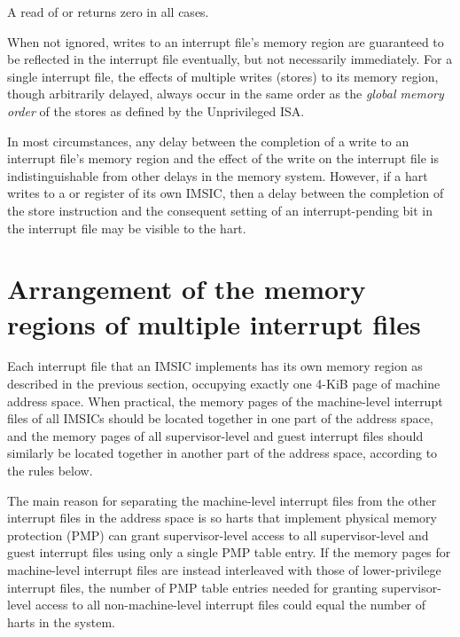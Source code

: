 A read of  or  returns zero in all
cases.

When not ignored, writes to an interrupt file's memory region are
guaranteed to be reflected in the interrupt file eventually, but not
necessarily immediately.
For a single interrupt file, the effects of multiple writes (stores) to
its memory region, though arbitrarily delayed, always occur in the same
order as the \textit{global memory order} of the stores as defined by
the {\RISCV} Unprivileged ISA.

\begin{commentary}
In most circumstances, any delay between the completion of a write to
an interrupt file's memory region and the effect of the write on the
interrupt file is indistinguishable from other delays in the memory
system.
However, if a hart writes to a  or 
register of its own IMSIC, then a delay between the completion of the
store instruction and the consequent setting of an interrupt-pending
bit in the interrupt file may be visible to the hart.
\end{commentary}

\section{Arrangement of the memory regions of multiple interrupt files}
\label{sec:IMSIC-systemMemRegions}

Each interrupt file that an IMSIC implements has its own memory
region as described in the previous section, occupying exactly one
\mbox{4-KiB} page of machine address space.
When practical, the memory pages of the machine-level interrupt files
of all IMSICs should be located together in one part of the address
space, and the memory pages of all supervisor-level and guest interrupt
files should similarly be located together in another part of the
address space, according to the rules below.

\begin{commentary}
The main reason for separating the machine-level interrupt files
from the other interrupt files in the address space is so harts that
implement physical memory protection (PMP) can grant supervisor-level
access to all supervisor-level and guest interrupt files using only a
single PMP table entry.
If the memory pages for machine-level interrupt files are instead
interleaved with those of lower-privilege interrupt files, the number
of PMP table entries needed for granting supervisor-level access to all
non-machine-level interrupt files could equal the number of harts in
the system.
\end{commentary}

